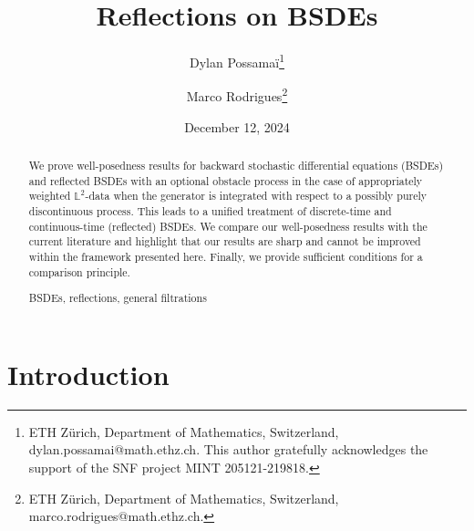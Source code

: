 \documentclass[10pt]{article} %
\newcommand{\1}{\mathbf{1}}
\begin{document}
\title{Reflections on BSDEs}


\author{Dylan {\sc Possama\"{i}}\footnote{ETH Z\"urich, Department of Mathematics, Switzerland, dylan.possamai@math.ethz.ch. This author gratefully acknowledges the support of the SNF project MINT 205121-219818.}\and Marco {\sc Rodrigues}\footnote{ETH Z\"urich, Department of Mathematics, Switzerland, marco.rodrigues@math.ethz.ch.}}

\date{December 12, 2024}

\maketitle

\begin{abstract}

We prove well-posedness results for backward stochastic differential equations (BSDEs) and reflected BSDEs with an optional obstacle process in the case of appropriately weighted $\mathbb{L}^2$-data when the generator is integrated with respect to a possibly purely discontinuous process. This leads to a unified treatment of discrete-time and continuous-time (reflected) BSDEs. We compare our well-posedness results with the current literature and highlight that our results are sharp and cannot be improved within the framework presented here. Finally, we provide sufficient conditions for a comparison principle.



\vspace{5mm}
  BSDEs, reflections, general filtrations\vspace{5mm}
\end{abstract}




	
\section{Introduction}\label{sec::introduction}
\end{document}

